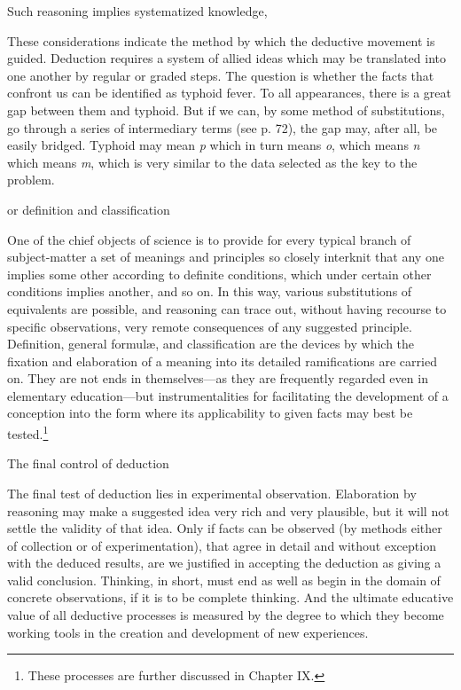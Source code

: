 \documentclass[letterpaper]{book}
\begin{document}
Such reasoning implies systematized knowledge,

These considerations indicate the method by which the deductive movement
is guided. Deduction requires a system of allied ideas which may be
translated into one another by regular or graded steps. The question is
whether the facts that confront us can be identified as typhoid fever.
To all appearances, there is a great gap between them and typhoid. But
if we can, by some method of substitutions, go through a series of
intermediary terms (see p. 72), the gap may, after all, be easily
bridged. Typhoid may mean \emph{p} which in turn means \emph{o}, which
means \emph{n} which means \emph{m}, which is very similar to the data
selected as the key to the problem.

or definition and classification

One of the chief objects of science is to provide for every typical
branch of subject-matter a set of meanings and principles so closely
interknit that any one implies some other according to definite
conditions, which under certain other conditions implies another, and so
on. In this way, various substitutions of equivalents are possible, and
reasoning can trace out, without having recourse to specific
observations, very remote consequences of any suggested principle.
Definition, general formulæ, and classification are the devices by which
the fixation and elaboration of a meaning into its detailed
ramifications are carried on. They are not ends in themselves---as they
are frequently regarded even in elementary education---but
instrumentalities for
facilitating
the development of a conception into the form where its applicability to
given facts may best be
tested.\footnote{These processes are further discussed in Chapter IX.}

The final control of deduction

The final test of deduction lies in experimental observation.
Elaboration by reasoning may make a suggested idea very rich and very
plausible, but it will not settle the validity of that idea. Only if
facts can be observed (by methods either of collection or of
experimentation), that agree in detail and without exception with the
deduced results, are we justified in accepting the deduction as giving a
valid conclusion. Thinking, in short, must end as well as begin in the
domain of concrete observations, if it is to be complete thinking. And
the ultimate educative value of all deductive processes is measured by
the degree to which they become working tools in the creation and
development of new experiences.
\end{document}
